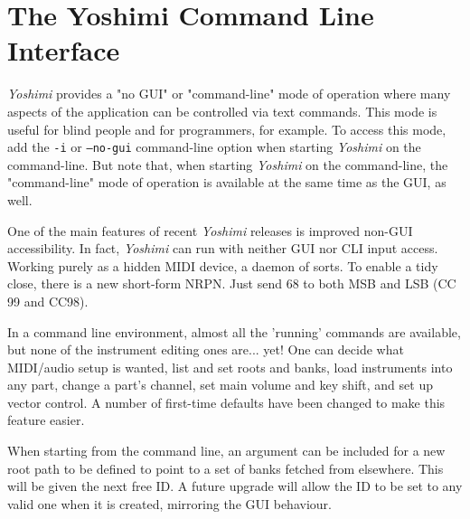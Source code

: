 %
%
%

\section{The Yoshimi Command Line Interface}
\label{sec:command_line}

   \textsl{Yoshimi} provides a "no GUI" or "command-line" mode of operation
   where many aspects of the application can be controlled via text commands.
   This mode is useful for blind people and for programmers, for example.  To
   access this mode, add the \texttt{-i} or \texttt{--no-gui} command-line
   option when starting \textsl{Yoshimi} on the command-line.  But note that,
   when starting \textsl{Yoshimi} on the command-line, the "command-line" mode
   of operation is available at the same time as the GUI, as well.

   One of the main features of recent \textsl{Yoshimi} releases
   is improved non-GUI accessibility.  In fact,
   \textsl{Yoshimi} can run with neither GUI nor CLI input access. Working
   purely as a hidden MIDI device, a daemon of sorts. To enable a tidy close,
   there is a new short-form NRPN. Just send 68 to both MSB and LSB (CC 99 and
   CC98).

   In a command line environment, almost all the 'running' commands are
   available, but none of the instrument editing ones are... yet!  One can
   decide what MIDI/audio setup is wanted, list and set roots and banks, load
   instruments into any part, change a part's channel, set main volume and key
   shift, and set up vector control.  A number of first-time defaults have been
   changed to make this feature easier.

   When starting from the command line, an argument can be included for a new
   root path to be defined to point to a set of banks fetched from elsewhere.
   This will be given the next free ID. A future upgrade will allow the ID to
   be set to any valid one when it is created, mirroring the GUI behaviour.

